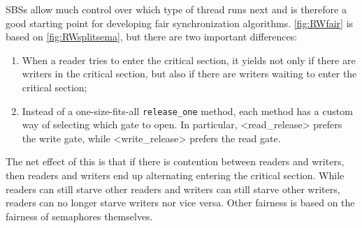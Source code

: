 \documentclass{report}
\newcommand{\harmonylink}[1]{%
[\href{https://harmony.cs.cornell.edu/#1}{\underline{#1}}]%
}
\newenvironment{code}{
\tcolorbox
}{
\endtcolorbox
}
\begin{document}
SBSs allow much control over which type of thread runs next and is therefore
a good starting point for developing fair synchronization algorithms.
\autoref{fig:RWfair} is based on \autoref{fig:RWsplitsema}, but there
are two important differences:

\begin{enumerate}
\item When a reader tries to enter the critical section, it yields not only
if there are writers in the critical section, but also if there are writers
waiting to enter the critical section;
\item Instead of a one-size-fits-all \texttt{release\_one} method, each
method has a custom way of selecting which gate to open.  In particular,
<{read_release}> prefers the write gate, while <{write_release}>
prefers the read gate.
\end{enumerate}

The net effect of this is that if there is contention between readers and
writers, then readers and writers end up alternating entering the critical
section.  While readers can still starve other readers and writers can still
starve other writers, readers can no longer starve writers nor vice versa.
Other fairness is based on the fairness of semaphores themselves.

\end{document}
